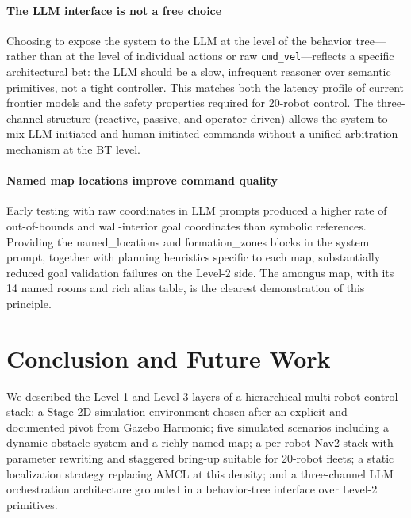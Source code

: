 \documentclass[conference]{IEEEtran}
\begin{document}
\paragraph{The LLM interface is not a free choice}
Choosing to expose the system to the LLM at the level of the
behavior tree---rather than at the level of individual actions
or raw \texttt{cmd\_vel}---reflects a specific architectural
bet: the LLM should be a slow, infrequent reasoner over
semantic primitives, not a tight controller. This matches both
the latency profile of current frontier models and the safety
properties required for 20-robot control. The three-channel
structure (reactive, passive, and operator-driven) allows the
system to mix LLM-initiated and human-initiated commands
without a unified arbitration mechanism at the BT level.

\paragraph{Named map locations improve command quality}
Early testing with raw coordinates in LLM prompts produced a
higher rate of out-of-bounds and wall-interior goal
coordinates than symbolic references. Providing the
\textsf{named\_locations} and \textsf{formation\_zones}
blocks in the system prompt, together with planning heuristics
specific to each map, substantially reduced goal validation
failures on the Level-2 side. The \textsf{amongus} map, with
its 14 named rooms and rich alias table, is the clearest
demonstration of this principle.

\section{Conclusion and Future Work}
\label{sec:conclusion}

We described the Level-1 and Level-3 layers of a hierarchical
multi-robot control stack: a Stage 2D simulation environment
chosen after an explicit and documented pivot from Gazebo
Harmonic; five simulated scenarios including a dynamic
obstacle system and a richly-named map; a per-robot Nav2 stack
with parameter rewriting and staggered bring-up suitable for
20-robot fleets; a static localization strategy replacing AMCL
at this density; and a three-channel LLM orchestration
architecture grounded in a behavior-tree interface over
Level-2 primitives.
\end{document}
